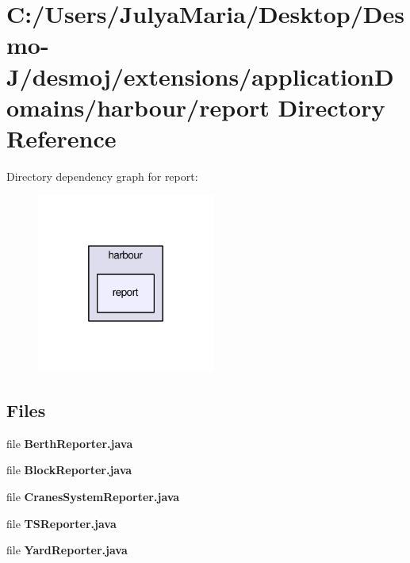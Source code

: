\section{C\-:/\-Users/\-Julya\-Maria/\-Desktop/\-Desmo-\/\-J/desmoj/extensions/application\-Domains/harbour/report Directory Reference}
\label{dir_c52731e2fd885ea16d5869b45731e19c}
Directory dependency graph for report\-:
\nopagebreak
\begin{figure}[H]
\begin{center}
\leavevmode
\includegraphics[width=166pt]{dir_c52731e2fd885ea16d5869b45731e19c_dep}
\end{center}
\end{figure}
\subsection*{Files}
\begin{DoxyCompactItemize}
\item 
file {\bfseries Berth\-Reporter.\-java}
\item 
file {\bfseries Block\-Reporter.\-java}
\item 
file {\bfseries Cranes\-System\-Reporter.\-java}
\item 
file {\bfseries T\-S\-Reporter.\-java}
\item 
file {\bfseries Yard\-Reporter.\-java}
\end{DoxyCompactItemize}

